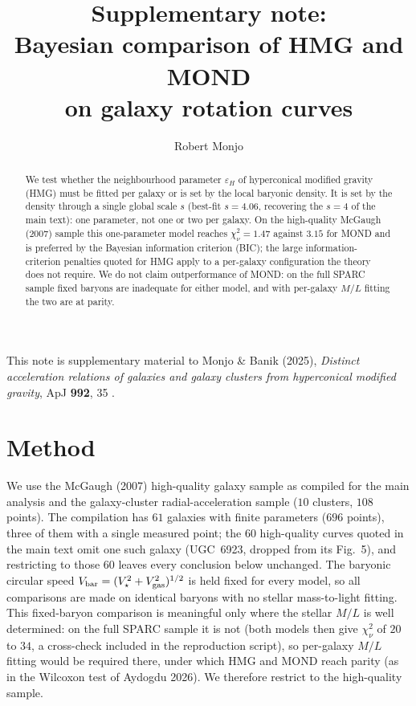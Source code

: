 \documentclass[11pt]{article}
\title{\vspace{-1.5em}\textbf{Supplementary note}: \\ Bayesian comparison of HMG and MOND\\
on galaxy rotation curves}
\author{Robert Monjo}
\date{}
\begin{document}
\maketitle
\vspace{-2em}

\begin{center}\vspace{-1em}
\small This note is supplementary material to Monjo \& Banik (2025),
\emph{Distinct acceleration relations of galaxies and galaxy clusters from
hyperconical modified gravity}, ApJ \textbf{992}, 35 \cite{Monjo2025}.
\end{center}
\medskip

\begin{abstract}
\noindent
We test whether the neighbourhood parameter $\varepsilon_H$ of hyperconical
modified gravity (HMG) must be fitted per galaxy or is set by the local baryonic
density. It is set by the density through a single global scale $s$ (best-fit
$s=4.06$, recovering the $s=4$ of the main text): one parameter, not one or two per
galaxy. On the high-quality McGaugh (2007) sample this one-parameter model reaches
$\chi^2_\nu=1.47$ against $3.15$ for MOND and is preferred by the Bayesian
information criterion (BIC); the large information-criterion penalties quoted for
HMG apply to a per-galaxy configuration the theory does not require. We do not
claim outperformance of MOND: on the full SPARC sample fixed baryons are inadequate
for either model, and with per-galaxy $M/L$ fitting the two are at parity.
\end{abstract}

\section{Method}
\label{sec:method}

We use the McGaugh (2007) high-quality galaxy sample as compiled for the main
analysis \cite{Monjo2025} and the galaxy-cluster radial-acceleration sample
($10$ clusters, $108$ points). The compilation has $61$ galaxies with finite
parameters ($696$ points), three of them with a single measured point; the $60$
high-quality curves quoted in the main text omit one such galaxy (UGC~6923,
dropped from its Fig.~5), and restricting to those $60$ leaves every conclusion
below unchanged. The baryonic circular speed
$V_{\rm bar}=(V_\star^2+V_{\rm gas}^2)^{1/2}$ is held fixed for every model, so all
comparisons are made on identical baryons with no stellar mass-to-light fitting.
This fixed-baryon comparison is meaningful only where the stellar $M/L$ is well
determined: on the full SPARC sample it is not (both models then give
$\chi^2_\nu$ of $20$ to $34$, a cross-check included in the reproduction script),
so per-galaxy $M/L$ fitting would be required there, under which HMG and MOND reach
parity (as in the Wilcoxon test of Aydogdu 2026). We therefore restrict to the
high-quality sample.
\end{document}
